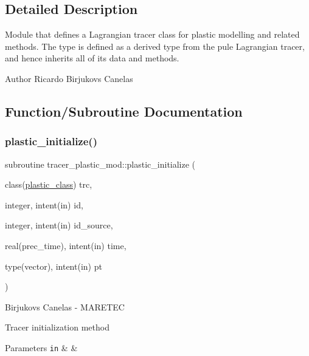 \subsection{Detailed Description}
Module that defines a Lagrangian tracer class for plastic modelling and related methods. The type is defined as a derived type from the pule Lagrangian tracer, and hence inherits all of it\textquotesingle{}s data and methods. 

\begin{DoxyAuthor}{Author}
Ricardo Birjukovs Canelas 
\end{DoxyAuthor}


\subsection{Function/\+Subroutine Documentation}
\mbox{\label{namespacetracer__plastic__mod_a42882cd86cfe30f341d8150582a664a9}} 
\subsubsection{\texorpdfstring{plastic\+\_\+initialize()}{plastic\_initialize()}}
{\footnotesize\ttfamily subroutine tracer\+\_\+plastic\+\_\+mod\+::plastic\+\_\+initialize (\begin{DoxyParamCaption}\item[{class(\hyperlink{structtracer__plastic__mod_1_1plastic__class}{plastic\+\_\+class})}]{trc,  }\item[{integer, intent(in)}]{id,  }\item[{integer, intent(in)}]{id\+\_\+source,  }\item[{real(prec\+\_\+time), intent(in)}]{time,  }\item[{type(vector), intent(in)}]{pt }\end{DoxyParamCaption})\hspace{0.3cm}{\ttfamily [private]}}



Birjukovs Canelas -\/ M\+A\+R\+E\+T\+EC 

Tracer initialization method 
\begin{DoxyParams}[1]{Parameters}
\mbox{\tt in}  & {\em } & \\
\hline
\end{DoxyParams}
